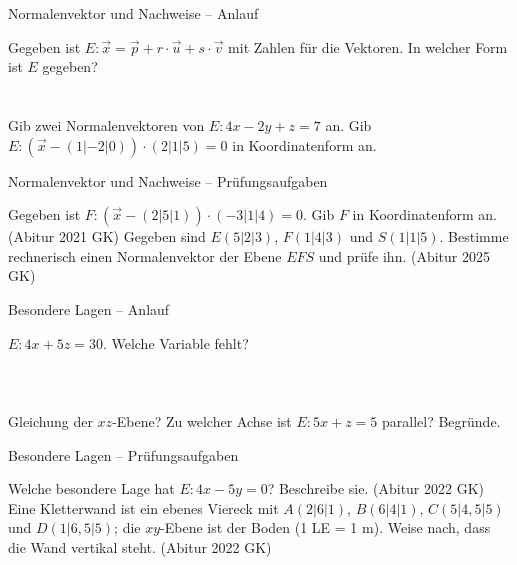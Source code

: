 \begin{aufgabe}{Normalenvektor und Nachweise – Anlauf}
\begin{teile}
\teil Gegeben ist $E\colon \vec x = \vec p + r \cdot \vec u + s \cdot \vec v$ mit Zahlen für die Vektoren. In welcher Form ist $E$ gegeben? \\  \\  \\ 
\teil Gib zwei Normalenvektoren von $E\colon 4x - 2y + z = 7$ an.
\teil Gib $E\colon \left(\vec x - (1 | -2 | 0)\right) \cdot (2 | 1 | 5) = 0$ in Koordinatenform an.
\end{teile}
\end{aufgabe}

\begin{aufgabe}{Normalenvektor und Nachweise – Prüfungsaufgaben}
\begin{teile}
\teil Gegeben ist $F\colon \left(\vec x - (2 | 5 | 1)\right) \cdot (-3 | 1 | 4) = 0$. Gib $F$ in Koordinatenform an. \hfill (Abitur 2021 GK)
\teil Gegeben sind $E(5 | 2 | 3)$, $F(1 | 4 | 3)$ und $S(1 | 1 | 5)$. Bestimme rechnerisch einen Normalenvektor der Ebene $EFS$ und prüfe ihn. \hfill (Abitur 2025 GK)
\end{teile}
\end{aufgabe}

\begin{aufgabe}{Besondere Lagen – Anlauf}
\begin{teile}
\teil $E\colon 4x + 5z = 30$. Welche Variable fehlt? \\  \\  \\  \\ 
\teil Gleichung der $xz$-Ebene?
\teil Zu welcher Achse ist $E\colon 5x + z = 5$ parallel? Begründe.
\end{teile}
\end{aufgabe}

\begin{aufgabe}{Besondere Lagen – Prüfungsaufgaben}
\begin{teile}
\teil Welche besondere Lage hat $E\colon 4x - 5y = 0$? Beschreibe sie. \hfill (Abitur 2022 GK)
\teil Eine Kletterwand ist ein ebenes Viereck mit $A(2 | 6 | 1)$, $B(6 | 4 | 1)$, $C(5 | 4{,}5 | 5)$ und $D(1 | 6{,}5 | 5)$; die $xy$-Ebene ist der Boden (1 LE = 1 m). Weise nach, dass die Wand vertikal steht. \hfill (Abitur 2022 GK)
\end{teile}
\end{aufgabe}

